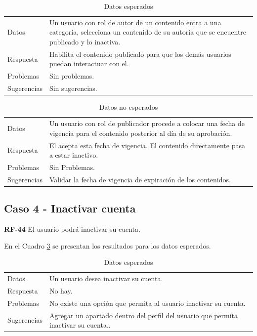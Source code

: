 \documentclass[10pt,times,twocolumn]{article}
\begin{document}
\begin{table}[H]
    \centering
    \begin{tabular}{p{3cm}p{4cm}}
        \rowcolor{gray!15}
        Datos & Un usuario con rol de autor de un contenido entra a una categoría, selecciona un contenido de su autoría que se encuentre publicado y lo inactiva.\\
       	Respuesta & Habilita el contenido publicado para que los demás usuarios puedan interactuar con el.\\
       	Problemas & Sin problemas.\\
       	Sugerencias & Sin sugerencias.\\
    \end{tabular}
    \caption{Datos esperados}
    \label{tab:caso3_esperado}
\end{table}

\begin{table}[H]
    \centering
    \begin{tabular}{p{3cm}p{4cm}}
        \rowcolor{gray!15}
        Datos & Un usuario con rol de publicador procede a colocar una fecha de vigencia para el contenido posterior al día de su aprobación.\\
        Respuesta & El acepta esta fecha de vigencia. El contenido directamente pasa a estar inactivo.\\
       	Problemas & Sin Problemas.\\
       	Sugerencias & Validar la fecha de vigencia de expiración de los contenidos.\\
    \end{tabular}
    \caption{Datos no esperados}
    \label{tab:caso3_no_esperado}
\end{table}

\subsection{Caso 4 - Inactivar cuenta}

\textbf{RF-44} El usuario podrá inactivar su cuenta.

En el Cuadro \ref{tab:caso4_esperado} se presentan los resultados para los datos esperados.

\begin{table}[H]
    \centering
    \begin{tabular}{p{3cm}p{4cm}}
        \rowcolor{gray!15}
        Datos & Un usuario desea inactivar su cuenta.\\
       	Respuesta & No hay.\\
       	Problemas & No existe una opción que permita al usuario inactivar su cuenta.\\
       	Sugerencias & Agregar un apartado dentro del perfil del usuario que permita inactivar su cuenta..\\
    \end{tabular}
    \caption{Datos esperados}
    \label{tab:caso4_esperado}
\end{table}
\end{document}

